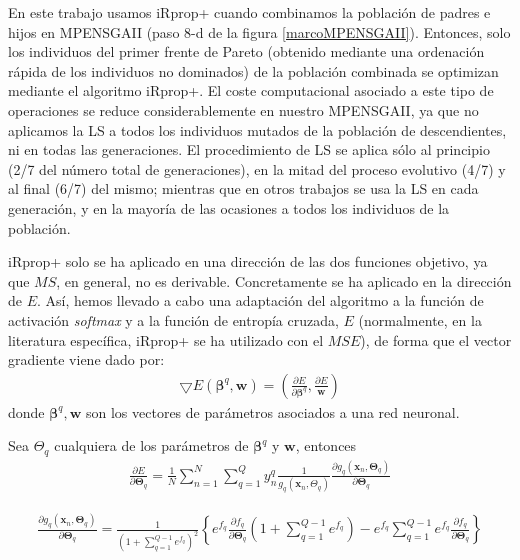 En este trabajo usamos iRprop+ cuando combinamos la población de padres
e hijos en
MPENSGAII (paso 8-d de la figura \ref{marcoMPENSGAII}). Entonces, solo los individuos del
primer frente de Pareto (obtenido mediante una ordenación rápida de los individuos no
dominados) de
la población combinada se optimizan mediante el algoritmo iRprop+. El coste
computacional
asociado a este tipo de operaciones se reduce considerablemente en nuestro MPENSGAII, ya
que no aplicamos la LS a todos los individuos mutados de la población de
descendientes, ni en todas las generaciones. El procedimiento de LS se aplica sólo al
principio (2/7 del número total de generaciones), en la mitad del proceso evolutivo (4/7)
y al final (6/7) del mismo; mientras que en otros trabajos \cite{Jin2008} se usa la
LS en cada generación, y en la mayoría de las ocasiones a todos los
individuos de la población.

iRprop+ solo se ha aplicado en una dirección de las dos funciones objetivo, ya que $MS$,
en general, no es derivable. Concretamente se ha aplicado en la dirección de $E$. Así,
hemos llevado a cabo una adaptación del algoritmo a la función de activación
\textit{softmax} y a la función de
entropía cruzada, $E$ (normalmente, en la literatura específica, iRprop+ se ha utilizado con el
$MSE$), de forma que el vector
gradiente viene dado por:
\begin{gather} \nonumber
\bigtriangledown E(\mathbf{\beta}^q , \mathbf{w})=\left( \frac{\partial
E}{\partial{\mathbf{\beta}^q}},\frac{\partial E}{ \mathbf{w} }\right)
\end{gather}
donde $\mathbf{\beta}^q,\mathbf{w}$ son los vectores de parámetros asociados a una red
neuronal.

Sea $\Theta_{q}$ cualquiera de los parámetros de $\mathbf{\beta}^q$ y $\mathbf{w}$,
entonces
\begin{gather} \nonumber
\frac{\partial E}{\partial \mathbf{\Theta}_{q}}=\frac{1}{N}\sum_{n=1}^N \sum_{q=1}^Q
y_{n}^q \frac{1}{g_{q}\left( \mathbf{x}_{n},\Theta_{q}\right)}  \frac{\partial g_{q}
\left(\mathbf{x}_{n} ,\mathbf{\Theta}_{q}\right)} {\partial \mathbf{\Theta}_{q}}
\end{gather}

\begin{small}
\begin{gather} \nonumber
\frac{\partial g_{q}
\left(\mathbf{x}_{n} ,\mathbf{\Theta}_{q}\right)} {\partial \mathbf{\Theta}_{q}} =
\frac{1}{\left( 1+\sum_{q=1}^{Q-1} e ^{f_{q}}\right)^2}\left\lbrace e ^{f_{q}}
\frac{\partial f_{q}}{\partial \mathbf{\Theta}_{q}}\left(1+\sum_{q=1}^{Q-1} e
^{f_{q}}\right)-e^{f_{q}}\sum_{q=1}^{Q-1} e^{f_{q}} \frac{\partial f_{q}}{\partial
\mathbf{\Theta}_{q}} \right\rbrace
\end{gather}
\end{small}

